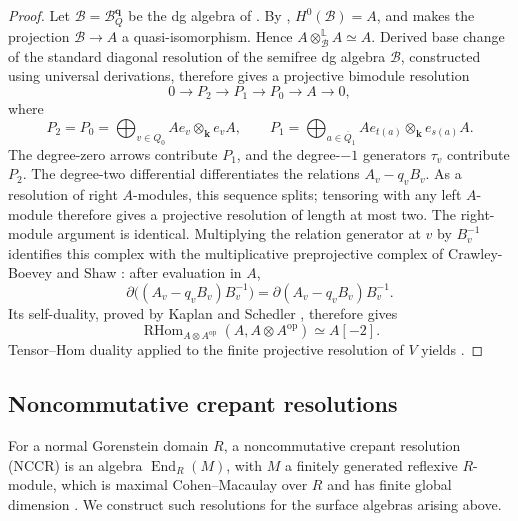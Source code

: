 \documentclass[a4paper]{amsart}
\newcommand{\kk}{\mathbf{k}}
\numberwithin{equation}{section}
\begin{document}
\begin{proof}
Let $\mathcal B=\mathcal B_Q^{\boldsymbol q}$ be the dg algebra of
. By ,
$H^0(\mathcal B)=A$, and  makes the
projection $\mathcal B\to A$ a quasi-isomorphism. Hence
$A\otimes_{\mathcal B}^{\mathbb L}A\simeq A$.
Derived base change of the standard diagonal resolution of the
semifree dg algebra $\mathcal B$, constructed using universal
derivations, therefore gives a projective bimodule resolution
\[
 0\longrightarrow P_2\longrightarrow P_1\longrightarrow P_0
 \longrightarrow A\longrightarrow0,
\]
where
\[
 P_2=P_0=\bigoplus_{v\in Q_0}Ae_v\otimes_{\kk}e_vA,
 \qquad
 P_1=\bigoplus_{a\in\overline Q_1}
 Ae_{t(a)}\otimes_{\kk}e_{s(a)}A.
\]
The degree-zero arrows contribute $P_1$, and the degree-$-1$
generators $\tau_v$ contribute $P_2$.
The degree-two differential differentiates the relations
$A_v-q_vB_v$. As a resolution of right $A$-modules, this sequence
splits; tensoring with any left $A$-module therefore gives a projective
resolution of length at most two. The right-module argument is identical.
Multiplying the relation generator at $v$ by
$B_v^{-1}$ identifies this complex with the multiplicative
preprojective complex of Crawley-Boevey and Shaw
\cite[Lemma~3.1]{CBShaw}: after evaluation in $A$,
\[
 \partial\bigl((A_v-q_vB_v)B_v^{-1}\bigr)
   =\partial(A_v-q_vB_v)B_v^{-1}.
\]
Its self-duality, proved by Kaplan and Schedler
\cite[Theorem~3.17 and Corollary~3.19]{KS}, therefore gives
\[
 \operatorname{RHom}_{A\otimes A^{\mathrm{op}}}
 (A,A\otimes A^{\mathrm{op}})\simeq A[-2].
\]
Tensor--Hom duality applied to the finite projective resolution
of $V$ yields .
\end{proof}

\subsection{Noncommutative crepant resolutions}
\label{subsec:surface}

For a normal Gorenstein domain $R$, a noncommutative crepant
resolution (NCCR) is an algebra $\operatorname{End}_R(M)$, with $M$
a finitely generated reflexive $R$-module, which is maximal
Cohen--Macaulay over $R$ and has finite global dimension
\cite[Definition~4.1 and Lemma~4.2]{VdBNCCR}. We construct such
resolutions for the surface algebras arising above.
\end{document}
